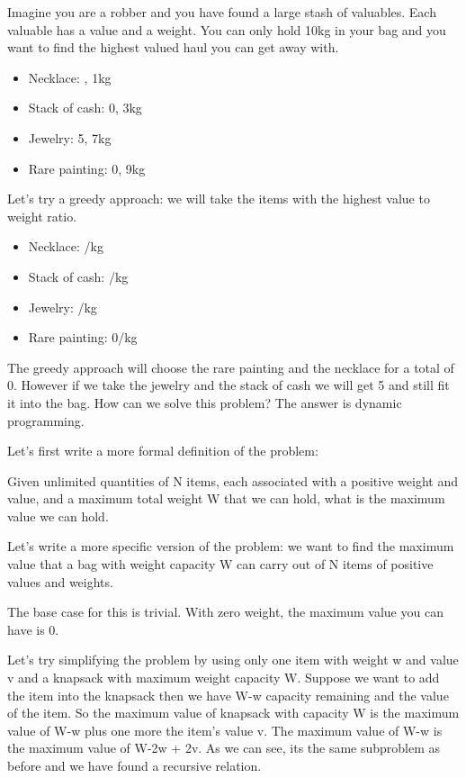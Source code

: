 \documentclass[11pt,oneside]{book}
\begin{document}
Imagine you are a robber and you have found a large stash of valuables. Each valuable has a value and a weight. You can only hold 10kg in your bag and you want to find the highest valued haul you can get away with.

\begin{itemize}
\item Necklace: , 1kg
\item Stack of cash: 0, 3kg
\item Jewelry: 5, 7kg
\item Rare painting: 0, 9kg
\end{itemize}

Let's try a greedy approach: we will take the items with the highest value to weight ratio.

\begin{itemize}
\item Necklace: /kg
\item Stack of cash: /kg
\item Jewelry: /kg
\item Rare painting: 0/kg
\end{itemize}

The greedy approach will choose the rare painting and the necklace for a total of 0. However if we take the jewelry and the stack of cash we will get 5 and still fit it into the bag. How can we solve this problem? The answer is dynamic programming.

Let's first write a more formal definition of the problem:

Given unlimited quantities of N items, each associated with a positive weight and value, and a maximum total weight W that we can hold, what is the maximum value we can hold.

Let's write a more specific version of the problem: we want to find the maximum value that a bag with weight capacity W can carry out of N items of positive values and weights.

The base case for this is trivial. With zero weight, the maximum value you can have is 0.

Let's try simplifying the problem by using only one item with weight w and value v and a knapsack with maximum weight capacity W. Suppose we want to add the item into the knapsack then we have W-w capacity remaining and the value of the item. So the maximum value of knapsack with capacity W is the maximum value of W-w plus one more the item's value v. The maximum value of W-w is the maximum value of W-2w + 2v. As we can see, its the same subproblem as before and we have found a recursive relation.
\end{document}
